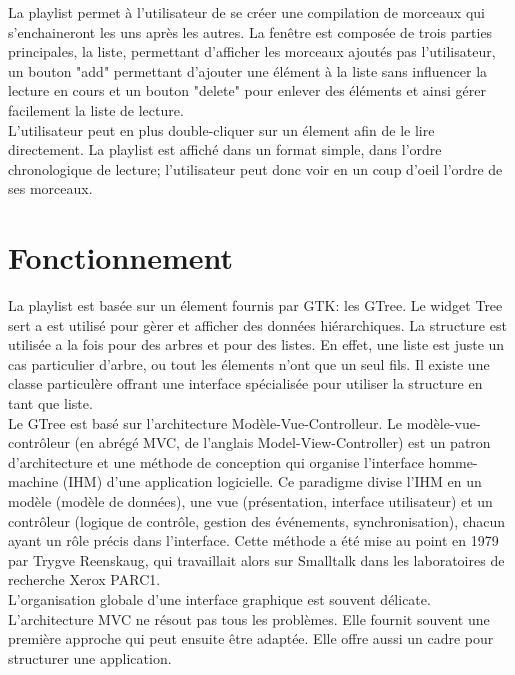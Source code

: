 \documentclass[12pt,a4paper]{report}
\begin{document}
La playlist permet à l'utilisateur de se créer une compilation de morceaux qui s'enchaineront les uns après les autres. La fenêtre est composée de trois parties principales, la liste, permettant d'afficher les morceaux ajoutés pas l'utilisateur, un bouton "add" permettant d'ajouter une élément à la liste sans influencer la lecture en cours et un bouton "delete" pour enlever des éléments et ainsi gérer facilement la liste de lecture.\\

L'utilisateur peut en plus double-cliquer sur un élement afin de le lire directement. La playlist est affiché dans un format simple, dans l'ordre chronologique de lecture; l'utilisateur peut donc voir en un coup d'oeil l'ordre de ses morceaux.

\section{Fonctionnement}

La playlist est basée sur un élement fournis par GTK: les GTree. Le widget Tree sert a est utilisé pour gèrer et afficher des données hiérarchiques. La structure est utilisée a la fois pour des arbres et pour des listes. En effet, une liste est juste un cas particulier d'arbre, ou tout les élements n'ont que un seul fils. Il existe une classe particulère offrant une interface spécialisée pour utiliser la structure en tant que liste.\\

Le GTree est basé sur l'architecture Modèle-Vue-Controlleur. Le modèle-vue-contrôleur (en abrégé MVC, de l'anglais Model-View-Controller) est un patron d'architecture et une méthode de conception qui organise l'interface homme-machine (IHM) d'une application logicielle. Ce paradigme divise l'IHM en un modèle (modèle de données), une vue (présentation, interface utilisateur) et un contrôleur (logique de contrôle, gestion des événements, synchronisation), chacun ayant un rôle précis dans l'interface. Cette méthode a été mise au point en 1979 par Trygve Reenskaug, qui travaillait alors sur Smalltalk dans les laboratoires de recherche Xerox PARC1.\\

L'organisation globale d'une interface graphique est souvent délicate. L'architecture MVC ne résout pas tous les problèmes. Elle fournit souvent une première approche qui peut ensuite être adaptée. Elle offre aussi un cadre pour structurer une application.\\
\end{document}
